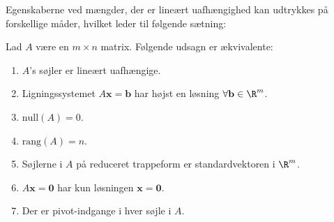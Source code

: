 %
%
%
Egenskaberne ved mængder, der er lineært uafhængighed kan udtrykkes på forskellige måder, hvilket leder til følgende sætning:
%
%
\begin{thm}{}{}
%
Lad $A$ være en $m \times n$ matrix.
Følgende udsagn er ækvivalente:
%
\begin{enumerate}[label=(\alph*)]
\item $A$'s søjler er lineært uafhængige. 
\item Ligningssystemet $A\mathbf{x}=\mathbf{b}$ har højst en løsning $\forall \mathbf{b} \in \R^m$.
\item $\text{null}(A)=0$.
\item $\text{rang}(A)=n$.
\item Søjlerne i $A$ på reduceret trappeform er standardvektoren i $\R^m$.
\item $A\mathbf{x}=\mathbf{0}$ har kun løsningen $\mathbf{x}=\mathbf{0}$.                                                                                                                                                                                                                                                                                                                         
\item Der er pivot-indgange i hver søjle i $A$. 
\end{enumerate}
%
\end{thm}
%
%
